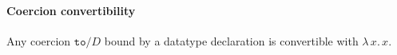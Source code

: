 \documentclass{article}
\newcommand{\absu}[3]{{#1}\, #2.\, #3}
\newcommand{\vars}[1]{{\overline{#1}}}
\newcommand{\reduce}{\ensuremath{\rightsquigarrow}}
\begin{document}
\paragraph{Coercion convertibility}
Any coercion $\texttt{to}/D$ bound by a datatype declaration is convertible with
\(\absu{λ}{x}{x}\).






\end{document}

